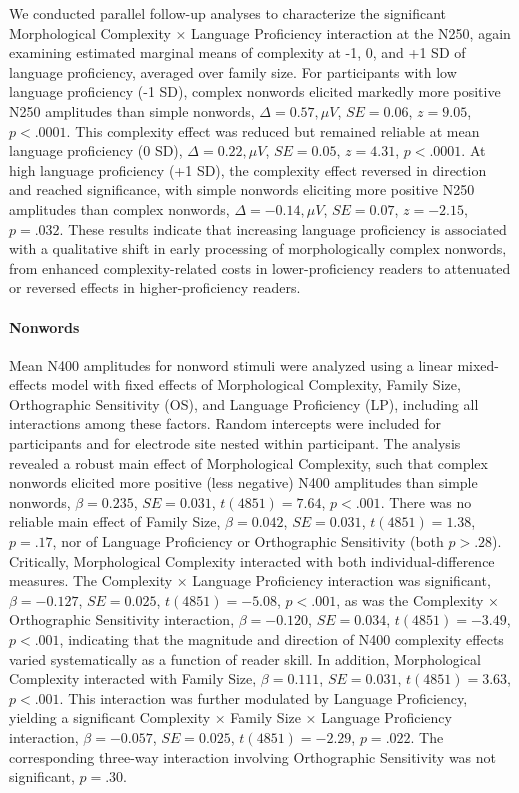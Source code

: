 We conducted parallel follow-up analyses to characterize the significant Morphological Complexity × Language Proficiency interaction at the N250, again examining estimated marginal means of complexity at -1, 0, and +1 SD of language proficiency, averaged over family size. For participants with low language proficiency (-1 SD), complex nonwords elicited markedly more positive N250 amplitudes than simple nonwords, $\Delta = 0.57,\mu V$, $SE = 0.06$, $z = 9.05$, $p < .0001$. This complexity effect was reduced but remained reliable at mean language proficiency (0 SD), $\Delta = 0.22,\mu V$, $SE = 0.05$, $z = 4.31$, $p < .0001$. At high language proficiency (+1 SD), the complexity effect reversed in direction and reached significance, with simple nonwords eliciting more positive N250 amplitudes than complex nonwords, $\Delta = -0.14,\mu V$, $SE = 0.07$, $z = -2.15$, $p = .032$. These results indicate that increasing language proficiency is associated with a qualitative shift in early processing of morphologically complex nonwords, from enhanced complexity-related costs in lower-proficiency readers to attenuated or reversed effects in higher-proficiency readers.

\paragraph*{Nonwords}
Mean N400 amplitudes for nonword stimuli were analyzed using a linear mixed-effects model with fixed effects of Morphological Complexity, Family Size, Orthographic Sensitivity (OS), and Language Proficiency (LP), including all interactions among these factors. Random intercepts were included for participants and for electrode site nested within participant. The analysis revealed a robust main effect of Morphological Complexity, such that complex nonwords elicited more positive (less negative) N400 amplitudes than simple nonwords, $\beta = 0.235$, $SE = 0.031$, $t(4851) = 7.64$, $p < .001$. There was no reliable main effect of Family Size, $\beta = 0.042$, $SE = 0.031$, $t(4851) = 1.38$, $p = .17$, nor of Language Proficiency or Orthographic Sensitivity (both $p > .28$). Critically, Morphological Complexity interacted with both individual-difference measures. The Complexity × Language Proficiency interaction was significant, $\beta = -0.127$, $SE = 0.025$, $t(4851) = -5.08$, $p < .001$, as was the Complexity × Orthographic Sensitivity interaction, $\beta = -0.120$, $SE = 0.034$, $t(4851) = -3.49$, $p < .001$, indicating that the magnitude and direction of N400 complexity effects varied systematically as a function of reader skill. In addition, Morphological Complexity interacted with Family Size, $\beta = 0.111$, $SE = 0.031$, $t(4851) = 3.63$, $p < .001$. This interaction was further modulated by Language Proficiency, yielding a significant Complexity × Family Size × Language Proficiency interaction, $\beta = -0.057$, $SE = 0.025$, $t(4851) = -2.29$, $p = .022$. The corresponding three-way interaction involving Orthographic Sensitivity was not significant, $p = .30$.

